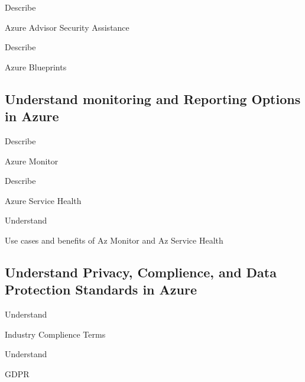 \documentclass{scrartcl}
\newenvironment{flashcard}[2][]{%
    #1
    \vfill
    \centerline{\Large{#2}}
    \vfill
\newpage
}
{\newpage}
\newcommand{\subsectioncard}[1]{
    \vspace*{\stretch{1}}
    \subsection{#1}
    \vspace*{\stretch{1}}
    \pagebreak
}
\begin{document}
    \begin{flashcard}[Describe]{Azure Advisor Security Assistance}

    \end{flashcard}

    \begin{flashcard}[Describe]{Azure Blueprints}

    \end{flashcard}

    \subsectioncard{Understand monitoring and Reporting Options in Azure}

    \begin{flashcard}[Describe]{Azure Monitor}

    \end{flashcard}

    \begin{flashcard}[Describe]{Azure Service Health}

    \end{flashcard}

    \begin{flashcard}[Understand]{Use cases and benefits of Az Monitor and Az Service Health}

    \end{flashcard}

    \subsectioncard{Understand Privacy, Complience, and Data Protection Standards in Azure}

    \begin{flashcard}[Understand]{Industry Complience Terms}

    \end{flashcard}

    \begin{flashcard}[Understand]{GDPR}

    \end{flashcard}
\end{document}
